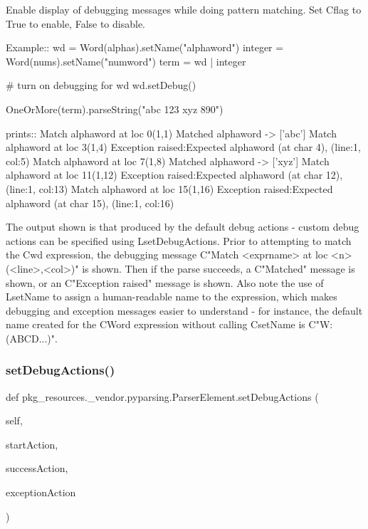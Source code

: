\begin{DoxyVerb}Enable display of debugging messages while doing pattern matching.
Set C{flag} to True to enable, False to disable.

Example::
    wd = Word(alphas).setName("alphaword")
    integer = Word(nums).setName("numword")
    term = wd | integer
    
    # turn on debugging for wd
    wd.setDebug()

    OneOrMore(term).parseString("abc 123 xyz 890")

prints::
    Match alphaword at loc 0(1,1)
    Matched alphaword -> ['abc']
    Match alphaword at loc 3(1,4)
    Exception raised:Expected alphaword (at char 4), (line:1, col:5)
    Match alphaword at loc 7(1,8)
    Matched alphaword -> ['xyz']
    Match alphaword at loc 11(1,12)
    Exception raised:Expected alphaword (at char 12), (line:1, col:13)
    Match alphaword at loc 15(1,16)
    Exception raised:Expected alphaword (at char 15), (line:1, col:16)

The output shown is that produced by the default debug actions - custom debug actions can be
specified using L{setDebugActions}. Prior to attempting
to match the C{wd} expression, the debugging message C{"Match <exprname> at loc <n>(<line>,<col>)"}
is shown. Then if the parse succeeds, a C{"Matched"} message is shown, or an C{"Exception raised"}
message is shown. Also note the use of L{setName} to assign a human-readable name to the expression,
which makes debugging and exception messages easier to understand - for instance, the default
name created for the C{Word} expression without calling C{setName} is C{"W:(ABCD...)"}.
\end{DoxyVerb}
 \mbox{\label{classpkg__resources_1_1__vendor_1_1pyparsing_1_1_parser_element_ab5d54e826cc3f133346a2aed5f77a1dc}} 
\subsubsection{\texorpdfstring{set\+Debug\+Actions()}{setDebugActions()}}
{\footnotesize\ttfamily def pkg\+\_\+resources.\+\_\+vendor.\+pyparsing.\+Parser\+Element.\+set\+Debug\+Actions (\begin{DoxyParamCaption}\item[{}]{self,  }\item[{}]{start\+Action,  }\item[{}]{success\+Action,  }\item[{}]{exception\+Action }\end{DoxyParamCaption})}

